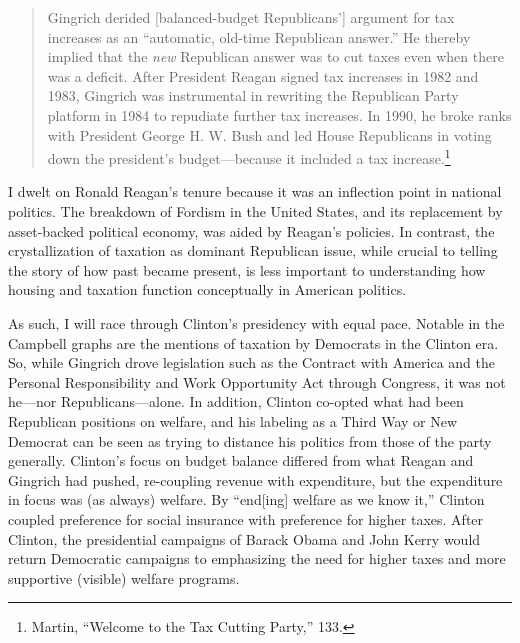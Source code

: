 \documentclass[
]{article}
\begin{document}
\begin{quote}
Gingrich derided {[}balanced-budget Republicans'{]} argument for tax increases as an ``automatic, old-time Republican answer.'' He thereby implied that the \emph{new} Republican answer was to cut taxes even when there was a deficit. After President Reagan signed tax increases in 1982 and 1983, Gingrich was instrumental in rewriting the Republican Party platform in 1984 to repudiate further tax increases. In 1990, he broke ranks with President George H. W. Bush and led House Republicans in voting down the president's budget---because it included a tax increase.\footnote{Martin, ``Welcome to the Tax Cutting Party,'' 133.}
\end{quote}

I dwelt on Ronald Reagan's tenure because it was an inflection point in national politics.
The breakdown of Fordism in the United States, and its replacement by asset-backed political economy, was aided by Reagan's policies.
In contrast, the crystallization of taxation as dominant Republican issue, while crucial to telling the story of how past became present, is less important to understanding how housing and taxation function conceptually in American politics.

As such, I will race through Clinton's presidency with equal pace.
Notable in the Campbell graphs are the mentions of taxation by Democrats in the Clinton era.
So, while Gingrich drove legislation such as the Contract with America and the Personal Responsibility and Work Opportunity Act through Congress, it was not he---nor Republicans---alone.
In addition, Clinton co-opted what had been Republican positions on welfare, and his labeling as a Third Way or New Democrat can be seen as trying to distance his politics from those of the party generally.
Clinton's focus on budget balance differed from what Reagan and Gingrich had pushed, re-coupling revenue with expenditure, but the expenditure in focus was (as always) welfare.
By ``end{[}ing{]} welfare as we know it,'' Clinton coupled preference for social insurance with preference for higher taxes.
After Clinton, the presidential campaigns of Barack Obama and John Kerry would return Democratic campaigns to emphasizing the need for higher taxes and more supportive (visible) welfare programs.
\end{document}
